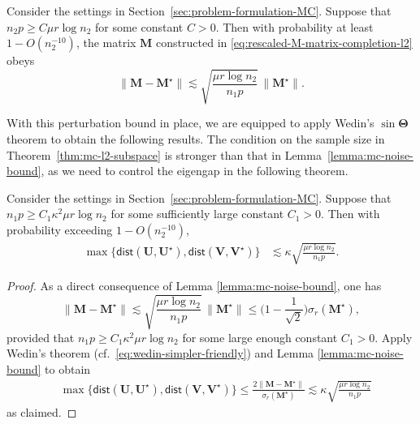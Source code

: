 \begin{lemma}
\label{lemma:mc-noise-bound}
Consider the settings in Section~\ref{sec:problem-formulation-MC}. Suppose that $n_{2}p\geq C\mu r\log n_{2}$ for some
 constant $C>0$. Then with probability at least
	$1-O(n_{2}^{-10})$, the matrix $\bm{M}$ constructed in \eqref{eq:rescaled-M-matrix-completion-l2} obeys
%
\[
	\big\| \bm{M} -\bm{M}^{\star} \big\|
	\lesssim\sqrt{\frac{\mu r\log n_{2}}{n_{1}p}}\, \big\| \bm{M}^{\star} \big\|.
\]
%
\end{lemma}
%
With this perturbation bound in place, we are equipped to apply Wedin's $\sin\bm{\Theta}$ theorem to obtain the following results.  The condition on the sample size in Theorem~\ref{thm:mc-l2-subspace} is stronger than that in Lemma~\ref{lemma:mc-noise-bound}, as we need to control the eigengap in the following theorem.
%
\begin{theorem}
\label{thm:mc-l2-subspace}
Consider the settings in Section~\ref{sec:problem-formulation-MC}.
Suppose that $n_{1}p\geq C_{1}\kappa^{2}\mu r\log n_{2}$ for some sufficiently
large constant $C_{1}>0$. Then with probability exceeding $1-O(n_2^{-10})$,
%
\begin{align*}
\max\Big\{ \mathsf{dist}\left(\bm{U},\bm{U}^{\star}\right),\mathsf{dist}\left(\bm{V},\bm{V}^{\star}\right)\Big\}  & \lesssim\kappa\sqrt{\frac{\mu r \log n_{2}}{n_{1}p}} .
\end{align*}
%
\end{theorem}
%
\begin{proof}
%	
As a direct consequence of Lemma \ref{lemma:mc-noise-bound}, one has
%
\[
	\big\| \bm{M} -\bm{M}^{\star} \big\|
	\lesssim\sqrt{\frac{\mu r\log n_{2}}{n_{1}p}} \,\big\| \bm{M}^{\star}\big\| \le \Big( 1 - \frac{1}{\sqrt{2}} \Big) \sigma_{r}(\bm{M}^{\star}),
\]
%
provided that $n_{1}p\geq C_{1}\kappa^{2}\mu r\log n_{2}$ for some  large enough constant $C_{1}>0$.
Apply Wedin's theorem (cf.~\eqref{eq:wedin-simpler-friendly}) and Lemma \ref{lemma:mc-noise-bound} to obtain
%
\begin{align*}
 & \max\Big\{ \mathsf{dist}\left(\bm{U},\bm{U}^{\star}\right),\mathsf{dist}\left(\bm{V},\bm{V}^{\star}\right) \Big\}
	\leq  \frac{2\big\|\bm{M} -\bm{M}^{\star}\big\|}{\sigma_{r}(\bm{M}^{\star})}
	\lesssim \kappa\sqrt{\frac{\mu r\log n_{2}}{n_{1}p}}
\end{align*}
%
as claimed.
%
\end{proof}


